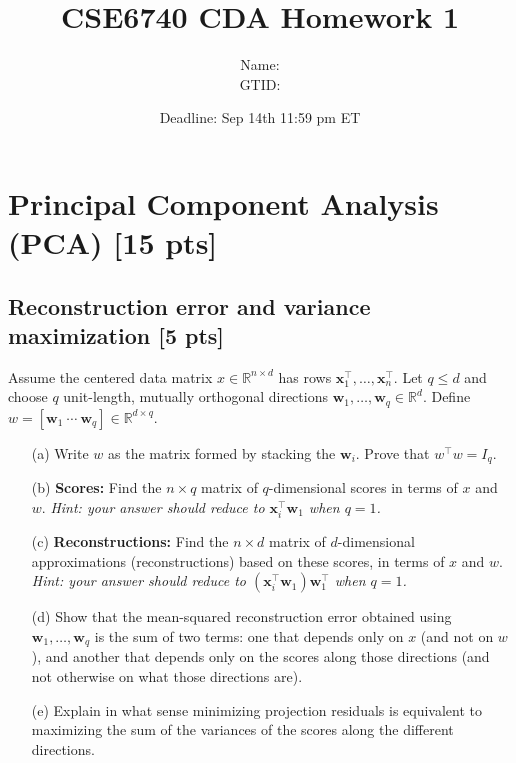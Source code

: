 \documentclass[11pt,epic]{article}
\begin{document}
\title{CSE6740 CDA Homework 1}
\author{
Name:  \\
GTID: 
}
\date{Deadline: Sep 14th 11:59 pm ET}
\maketitle

\section{Principal Component Analysis (PCA) [15 pts]}

\subsection{Reconstruction error and variance maximization [5 pts] }

Assume the centered data matrix $x\in\mathbb{R}^{n\times d}$ has rows $\mathbf{x}_1^\top,\ldots,\mathbf{x}_n^\top$. Let $q\le d$ and choose $q$ unit-length, mutually orthogonal directions $\mathbf{w}_1,\ldots,\mathbf{w}_q\in\mathbb{R}^d$. Define $w=[\mathbf{w}_1\ \cdots\ \mathbf{w}_q]\in\mathbb{R}^{d\times q}$.

\begin{enumerate}
\item[(a)] Write $w$ as the matrix formed by stacking the $\mathbf{w}_i$. Prove that $w^\top w = I_q$.

\item[(b)] \textbf{Scores:} Find the $n\times q$ matrix of $q$-dimensional scores in terms of $x$ and $w$. \textit{Hint: your answer should reduce to $\mathbf{x}_i^\top\mathbf{w}_1$ when $q=1$.}

\item[(c)] \textbf{Reconstructions:} Find the $n\times d$ matrix of $d$-dimensional approximations (reconstructions) based on these scores, in terms of $x$ and $w$. \textit{Hint: your answer should reduce to $(\mathbf{x}_i^\top\mathbf{w}_1)\mathbf{w}_1^\top$ when $q=1$.}

\item[(d)] Show that the mean-squared reconstruction error obtained using $\mathbf{w}_1,\ldots,\mathbf{w}_q$ is the sum of two terms: one that depends only on $x$ (and not on $w$), and another that depends only on the scores along those directions (and not otherwise on what those directions are). 

\item[(e)] Explain in what sense minimizing projection residuals is equivalent to maximizing the sum of the variances of the scores along the different directions.
\end{enumerate}
\end{document}
